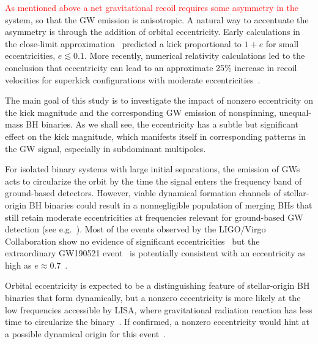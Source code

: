 \documentclass[floats,floatfix,showpacs,amssymb,prd,twocolumn,superscriptaddress,nofootinbib,nolongbibliography,reprint]{revtex4-2}
\newcommand{\mr}[1]{{\textcolor{cyan}{\sf{[MR: #1]}} }}
\newcommand{\eb}[1]{{\textcolor{blue}{\sf{[EB: #1]}} }}
\newcommand{\new}[1]{{\textcolor{red}{ #1} }}
\begin{document}

\new{As mentioned above a net gravitational recoil requires some asymmetry in the}
system, so that the GW emission is anisotropic.
A natural way to
accentuate the asymmetry is through the addition of orbital
eccentricity. Early calculations in the close-limit
approximation~\cite{Sopuerta:2006et} predicted a kick proportional to
$1+e$ for small eccentricities, $e\lesssim 0.1$.  More recently,
numerical relativity calculations led to the conclusion that
eccentricity can lead to an approximate 25\% increase in recoil
velocities for superkick configurations with moderate
eccentricities~\cite{Sperhake:2019wwo}.

The main goal of this study is to investigate the impact of nonzero
eccentricity on the kick magnitude and the corresponding GW emission
of nonspinning, unequal-mass BH binaries.  As we shall see, the
eccentricity has a subtle but significant effect on the kick
magnitude, which manifests itself in corresponding patterns in the GW
signal, especially in subdominant multipoles.

For isolated binary systems with large initial separations, the
emission of GWs acts to circularize the orbit by the time the signal
enters the frequency band of ground-based detectors.  However, viable
dynamical formation channels of stellar-origin BH binaries could
result in a nonnegligible population of merging BHs that still retain
moderate eccentricities at frequencies relevant for ground-based GW
detection
(see
e.g.~\cite{Samsing:2017rat,Samsing:2017xmd,Samsing:2017oij,Rodriguez:2018pss,Samsing:2020tda,Tagawa:2020jnc}).
Most of the events observed by the LIGO/Virgo Collaboration show no
evidence of significant eccentricities~\cite{Salemi:2019owp} but the
extraordinary GW190521 event~\cite{Abbott:2020tfl} is potentially
consistent with an eccentricity as high as
$e\approx0.7$~\cite{Romero-Shaw:2020thy,Gayathri:2020coq}.

Orbital eccentricity is expected to be a distinguishing feature of
stellar-origin BH binaries that form dynamically, but a nonzero
eccentricity is more likely at the low frequencies accessible by LISA,
where gravitational radiation reaction has less time to circularize
the binary~\cite{Nishizawa:2016jji,Breivik:2016ddj,Nishizawa:2016eza}.
If confirmed, a nonzero eccentricity would hint at a possible
dynamical origin for this event~\cite{Romero-Shaw:2020thy}.
\end{document}

